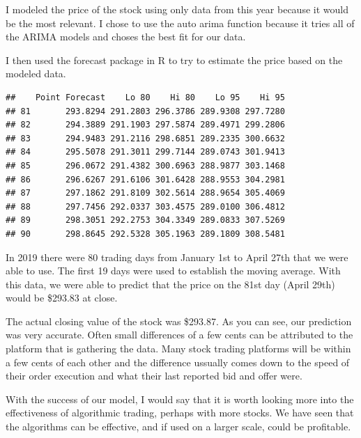 \documentclass[]{article}
\newenvironment{Shaded}{\begin{snugshade}}{\end{snugshade}}
\newcommand{\KeywordTok}[1]{\textcolor[rgb]{0.13,0.29,0.53}{\textbf{#1}}}
\newcommand{\NormalTok}[1]{#1}
\newcommand{\OperatorTok}[1]{\textcolor[rgb]{0.81,0.36,0.00}{\textbf{#1}}}
\newcommand{\StringTok}[1]{\textcolor[rgb]{0.31,0.60,0.02}{#1}}
\begin{document}
I modeled the price of the stock using only data from this year because
it would be the most relevant. I chose to use the auto arima function
because it tries all of the ARIMA models and choses the best fit for our
data.

I then used the forecast package in R to try to estimate the price based
on the modeled data.

\begin{Shaded}
\end{Shaded}

\begin{verbatim}
##    Point Forecast    Lo 80    Hi 80    Lo 95    Hi 95
## 81       293.8294 291.2803 296.3786 289.9308 297.7280
## 82       294.3889 291.1903 297.5874 289.4971 299.2806
## 83       294.9483 291.2116 298.6851 289.2335 300.6632
## 84       295.5078 291.3011 299.7144 289.0743 301.9413
## 85       296.0672 291.4382 300.6963 288.9877 303.1468
## 86       296.6267 291.6106 301.6428 288.9553 304.2981
## 87       297.1862 291.8109 302.5614 288.9654 305.4069
## 88       297.7456 292.0337 303.4575 289.0100 306.4812
## 89       298.3051 292.2753 304.3349 289.0833 307.5269
## 90       298.8645 292.5328 305.1963 289.1809 308.5481
\end{verbatim}

In 2019 there were 80 trading days from January 1st to April 27th that
we were able to use. The first 19 days were used to establish the moving
average. With this data, we were able to predict that the price on the
81st day (April 29th) would be \$293.83 at close.

The actual closing value of the stock was \$293.87. As you can see, our
prediction was very accurate. Often small differences of a few cents can
be attributed to the platform that is gathering the data. Many stock
trading platforms will be within a few cents of each other and the
difference ussually comes down to the speed of their order execution and
what their last reported bid and offer were.

With the success of our model, I would say that it is worth looking more
into the effectiveness of algorithmic trading, perhaps with more stocks.
We have seen that the algorithms can be effective, and if used on a
larger scale, could be profitable.
\end{document}

